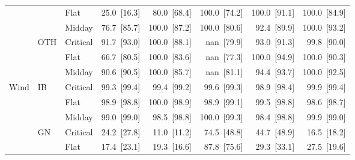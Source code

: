 \begin{tabular}{l l l r r r r r}
 &  & Flat & 25.0~{\color{seasoncol}\scriptsize[16.3]} & 80.0~{\color{seasoncol}\scriptsize[68.4]} & 100.0~{\color{seasoncol}\scriptsize[74.2]} & 100.0~{\color{seasoncol}\scriptsize[91.1]} & 100.0~{\color{seasoncol}\scriptsize[84.9]} \\
 &  & Midday & 76.7~{\color{seasoncol}\scriptsize[85.7]} & 100.0~{\color{seasoncol}\scriptsize[87.2]} & 100.0~{\color{seasoncol}\scriptsize[80.6]} & 92.4~{\color{seasoncol}\scriptsize[89.9]} & 100.0~{\color{seasoncol}\scriptsize[93.2]} \\
 & OTH & Critical & 91.7~{\color{seasoncol}\scriptsize[93.0]} & 100.0~{\color{seasoncol}\scriptsize[88.1]} & nan~{\color{seasoncol}\scriptsize[79.9]} & 93.0~{\color{seasoncol}\scriptsize[91.3]} & 99.8~{\color{seasoncol}\scriptsize[90.0]} \\
 &  & Flat & 66.7~{\color{seasoncol}\scriptsize[80.5]} & 100.0~{\color{seasoncol}\scriptsize[83.6]} & nan~{\color{seasoncol}\scriptsize[77.3]} & 100.0~{\color{seasoncol}\scriptsize[94.9]} & 100.0~{\color{seasoncol}\scriptsize[90.3]} \\
 &  & Midday & 90.6~{\color{seasoncol}\scriptsize[90.5]} & 100.0~{\color{seasoncol}\scriptsize[85.7]} & nan~{\color{seasoncol}\scriptsize[81.1]} & 94.4~{\color{seasoncol}\scriptsize[93.7]} & 100.0~{\color{seasoncol}\scriptsize[92.5]} \\
\addlinespace
Wind & IB & Critical & 99.3~{\color{seasoncol}\scriptsize[99.4]} & 99.4~{\color{seasoncol}\scriptsize[99.2]} & 99.6~{\color{seasoncol}\scriptsize[99.3]} & 98.9~{\color{seasoncol}\scriptsize[98.4]} & 99.9~{\color{seasoncol}\scriptsize[99.4]} \\
 &  & Flat & 98.9~{\color{seasoncol}\scriptsize[98.8]} & 100.0~{\color{seasoncol}\scriptsize[98.9]} & 98.9~{\color{seasoncol}\scriptsize[99.1]} & 99.5~{\color{seasoncol}\scriptsize[98.8]} & 98.6~{\color{seasoncol}\scriptsize[98.7]} \\
 &  & Midday & 99.0~{\color{seasoncol}\scriptsize[99.0]} & 98.5~{\color{seasoncol}\scriptsize[98.8]} & 100.0~{\color{seasoncol}\scriptsize[99.3]} & 98.4~{\color{seasoncol}\scriptsize[98.8]} & 99.9~{\color{seasoncol}\scriptsize[99.0]} \\
 & GN & Critical & 24.2~{\color{seasoncol}\scriptsize[27.8]} & 11.0~{\color{seasoncol}\scriptsize[11.2]} & 74.5~{\color{seasoncol}\scriptsize[48.8]} & 44.7~{\color{seasoncol}\scriptsize[48.9]} & 16.5~{\color{seasoncol}\scriptsize[18.2]} \\
 &  & Flat & 17.4~{\color{seasoncol}\scriptsize[23.1]} & 19.3~{\color{seasoncol}\scriptsize[16.6]} & 87.8~{\color{seasoncol}\scriptsize[75.6]} & 29.3~{\color{seasoncol}\scriptsize[33.1]} & 27.5~{\color{seasoncol}\scriptsize[19.6]} \\

\end{tabular}
